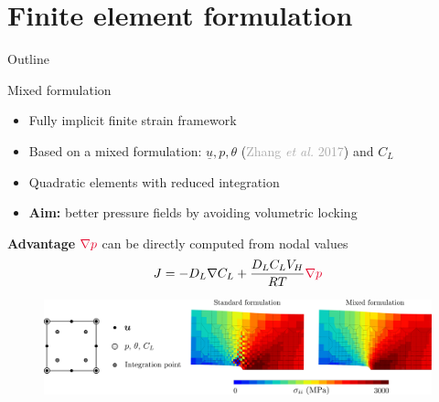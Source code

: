 \documentclass[9pt]{beamer}
\begin{document}
\section{Finite element formulation}

\begin{frame}{Outline}
	\tableofcontents[ 
    currentsubsection, 
    hideothersubsections, 
    sectionstyle=show/shaded, 
    subsectionstyle=show/shaded, 
    ] 
\end{frame}


\begin{frame}{Mixed formulation}

    \begin{itemize}
        \item Fully implicit finite strain framework
        \vspace{0.1cm}
        \item Based on a mixed formulation: $\underline{u}, p, \theta$ (\textcolor{darkgray}{Zhang \textit{et al.} 2017}) and $C_L$ 
        \vspace{0.1cm}
        \item Quadratic elements with reduced integration
        \vspace{0.1cm}
        \item \textbf{Aim:} better pressure fields by avoiding volumetric locking
    \end{itemize}

    \begin{block}{\textbf{Advantage}}
        $\textcolor{NewRed}{\nabla p}$ can be directly computed from nodal values
        \begin{equation*}
            J = {-D_L \nabla C_L} + {{\frac{D_L C_L V_H}{RT} \textcolor{NewRed}{\nabla p}}}
        \end{equation*} 
    \end{block}
    
    \vspace{0.1cm}
    
    \begin{figure}
        \centering
        \includegraphics[width=1.\textwidth]{Images/volumetric_locking.pdf}
    \end{figure}


\end{frame}
\end{document}
